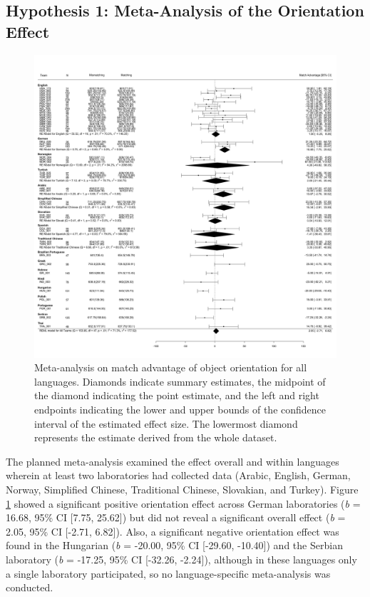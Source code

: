 \documentclass[
  man,floatsintext]{apa7}
\begin{document}
\hypertarget{hypothesis-1-meta-analysis-of-the-orientation-effect}{%
\subsection{Hypothesis 1: Meta-Analysis of the Orientation Effect}\label{hypothesis-1-meta-analysis-of-the-orientation-effect}}

\begin{figure}
\includegraphics[width=1\linewidth,height=0.9\textheight]{includes/fig/meta-all} \caption{Meta-analysis on match advantage of object orientation for all languages. Diamonds indicate summary estimates, the midpoint of the diamond indicating the point estimate, and the left and right endpoints indicating the lower and upper bounds of the confidence interval of the estimated effect size. The lowermost diamond represents the estimate derived from the whole dataset.}\label{fig:meta-all-plot}
\end{figure}

The planned meta-analysis examined the effect overall and within
languages wherein at least two laboratories had collected data (Arabic,
English, German, Norway, Simplified Chinese, Traditional Chinese,
Slovakian, and Turkey). Figure \ref{fig:meta-all-plot} showed a
significant positive orientation effect across German laboratories (\emph{b}
= 16.68, 95\% CI
{[}7.75,
25.62{]}) but did not reveal a
significant overall effect (\emph{b} =
2.05, 95\% CI
{[}-2.71,
6.82{]}). Also, a significant
negative orientation effect was found in the Hungarian (\emph{b} = -20.00,
95\% CI {[}-29.60, -10.40{]}) and the Serbian laboratory (\emph{b} = -17.25, 95\%
CI {[}-32.26, -2.24{]}), although in these languages only a single
laboratory participated, so no language-specific meta-analysis was
conducted.
\end{document}
